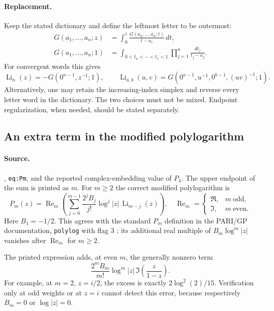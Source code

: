 \documentclass[11pt,a4paper]{article}
\DeclareMathOperator{\Li}{Li}
\theoremstyle{definition}
\theoremstyle{remark}
\numberwithin{equation}{section}
\begin{document}
\paragraph{Replacement.}
Keep the stated dictionary and define the leftmost letter to be outermost:
\begin{align*}
 G(a_1,\ldots,a_n;z)
   &=\int_0^z\frac{G(a_2,\ldots,a_n;t)}{t-a_1}\,dt,\\
 G(a_1,\ldots,a_n;1)
   &=\int_{0<t_n<\cdots<t_1<1}
            \prod_{j=1}^n\frac{dt_j}{t_j-a_j}.
\end{align*}
For convergent words this gives
\[
 \Li_n(z)=-G(0^{n-1},z^{-1};1),\qquad
 \Li_{a,b}(u,v)=G(0^{a-1},u^{-1},0^{b-1},(uv)^{-1};1).
\]
Alternatively, one may retain the increasing-index simplex and reverse
every letter word in the dictionary. The two choices must not be mixed.
Endpoint regularization, when needed, should be stated separately.

\subsection{An extra term in the modified polylogarithm}
\label{audit:poly:modified}

\paragraph{Source.}
,
\texttt{eq:Pm}, and the reported complex-embedding value of $P_4$.
The upper endpoint of the sum is printed as $m$. For $m\geq2$ the correct
modified polylogarithm is
\begin{equation}\label{audit:poly:correct-P}
 P_m(z)=\operatorname{Re}_m\!\left(
       \sum_{j=0}^{m-1}\frac{2^jB_j}{j!}
          \log^j|z|\,\Li_{m-j}(z)\right),
 \quad
 \operatorname{Re}_m=
 \begin{cases}\Re,&m\ \text{odd},\\\Im,&m\ \text{even}.
 \end{cases}
\end{equation}
Here $B_1=-1/2$. This agrees with the standard $P_m$ definition in the
PARI/GP documentation, \texttt{polylog} with flag $3$
\cite{audit-pari-polylog}; its additional real multiple of
$B_m\log^m|z|$ vanishes after $\operatorname{Re}_m$ for $m\geq2$.

The printed expression adds, at even $m$, the generally nonzero term
\begin{equation}\label{audit:poly:P-error}
 \frac{2^mB_m}{m!}\log^m|z|\,
             \Im\!\left(\frac{z}{1-z}\right).
\end{equation}
For example, at $m=2$, $z=i/2$, the excess is exactly
$2\log^2(2)/15$. Verification only at odd weights or at $z=i$ cannot
detect this error, because respectively $B_m=0$ or $\log|z|=0$.
\end{document}

